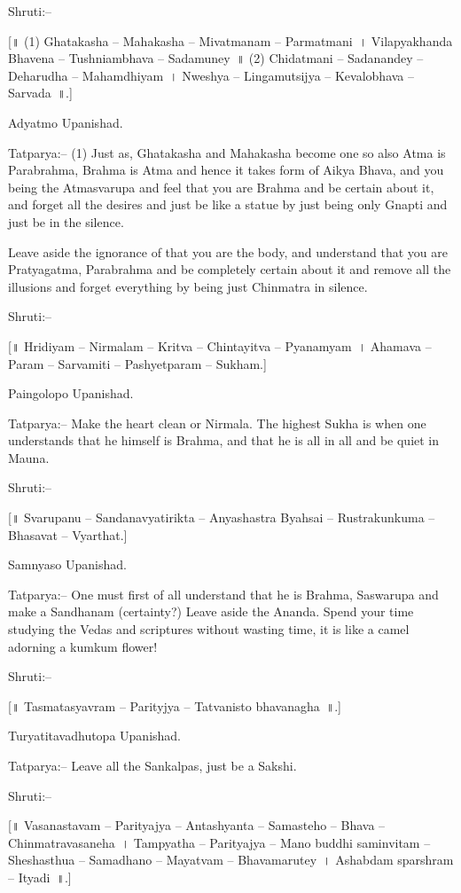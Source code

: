 Shruti:–

[॥ (1) Ghatakasha – Mahakasha – Mivatmanam – Parmatmani~। Vilapyakhanda Bhavena – Tushniambhava – Sadamuney~॥ (2) Chidatmani – Sadanandey – Deharudha – Mahamdhiyam~। Nweshya – Lingamutsijya – Kevalobhava – Sarvada~॥.]

Adyatmo Upanishad.

Tatparya:– (1) Just as, Ghatakasha and Mahakasha become one so also Atma is Parabrahma, Brahma is Atma and hence it takes form of Aikya Bhava, and you being the Atmasvarupa and feel that you are Brahma and be certain about it, and forget all the desires and just be like a statue by just being only Gnapti and just be in the silence.

Leave aside the ignorance of that you are the body, and understand that you are Pratyagatma, Parabrahma and be completely certain about it and remove all the illusions and forget everything by being just Chinmatra in silence.

Shruti:–

[॥ Hridiyam – Nirmalam – Kritva – Chintayitva – Pyanamyam~। Ahamava – Param – Sarvamiti – Pashyetparam – Sukham.]

Paingolopo Upanishad.

Tatparya:– Make the heart clean or Nirmala. The highest Sukha is when one understands that he himself is Brahma, and that he is all in all and be quiet in Mauna.

Shruti:–

[॥ Svarupanu – Sandanavyatirikta – Anyashastra Byahsai – Rustrakunkuma – Bhasavat – Vyarthat.]

Samnyaso Upanishad.

Tatparya:– One must first of all understand that he is Brahma, Saswarupa and make a Sandhanam (certainty?) Leave aside the Ananda. Spend your time studying the Vedas and scriptures without wasting time, it is like a camel adorning a kumkum flower!

Shruti:–

[॥ Tasmatasyavram – Parityjya – Tatvanisto bhavanagha~॥.]

Turyatitavadhutopa Upanishad.

Tatparya:– Leave all the Sankalpas, just be a Sakshi.

Shruti:–

[॥ Vasanastavam – Parityajya – Antashyanta – Samasteho – Bhava – Chinmatravasaneha~। Tampyatha – Parityajya – Mano buddhi saminvitam – Sheshasthua – Samadhano – Mayatvam – Bhavamarutey~। Ashabdam sparshram – Ityadi~॥.]

